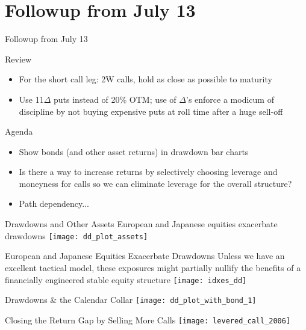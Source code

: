 \documentclass{beamer}
\begin{document}
\section{Followup from July 13}

\begin{frame}{Followup from July 13}
\begin{block}{Review}
\begin{itemize}
\item For the short call leg: 2W calls, hold as close as possible to maturity
\item Use 11$\Delta$ puts instead of 20\% OTM; use of $\Delta$'s enforce a modicum of discipline by not buying expensive puts at roll time after a huge sell-off 
\end{itemize}
\end{block}

\begin{block}{Agenda}
\begin{itemize}
\item Show bonds (and other asset returns) in drawdown bar charts
\item Is there a way to increase returns by selectively choosing leverage and moneyness for calls so we can eliminate leverage for the overall structure?
\item Path dependency...
\end{itemize}
\end{block}

\end{frame}

\begin{frame}{Drawdowns and Other Assets}
European and Japanese equities exacerbate drawdowns
\texttt{[image: dd\_plot\_assets]}
\end{frame}

\begin{frame}{European and Japanese Equities Exacerbate Drawdowns}
\small Unless we have an excellent tactical model, these exposures might partially nullify the benefits of a financially engineered stable equity structure
\texttt{[image: idxes\_dd]}
\end{frame}


\begin{frame}{Drawdowns \& the Calendar Collar}
\texttt{[image: dd\_plot\_with\_bond\_1]}
\end{frame}


\begin{frame}{Closing the Return Gap by Selling More Calls}
\texttt{[image: levered\_call\_2006]}
\end{frame}
\end{document}
